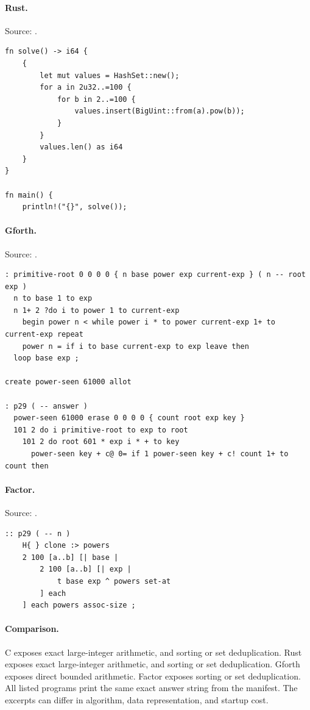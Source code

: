 \paragraph{Rust.} Source: .
\begin{lstlisting}
fn solve() -> i64 {
    {
        let mut values = HashSet::new();
        for a in 2u32..=100 {
            for b in 2..=100 {
                values.insert(BigUint::from(a).pow(b));
            }
        }
        values.len() as i64
    }
}

fn main() {
    println!("{}", solve());
\end{lstlisting}

\paragraph{Gforth.} Source: .
\begin{lstlisting}
: primitive-root 0 0 0 0 { n base power exp current-exp } ( n -- root exp )
  n to base 1 to exp
  n 1+ 2 ?do i to power 1 to current-exp
    begin power n < while power i * to power current-exp 1+ to current-exp repeat
    power n = if i to base current-exp to exp leave then
  loop base exp ;

create power-seen 61000 allot

: p29 ( -- answer )
  power-seen 61000 erase 0 0 0 0 { count root exp key }
  101 2 do i primitive-root to exp to root
    101 2 do root 601 * exp i * + to key
      power-seen key + c@ 0= if 1 power-seen key + c! count 1+ to count then
\end{lstlisting}

\paragraph{Factor.} Source: .
\begin{lstlisting}
:: p29 ( -- n )
    H{ } clone :> powers
    2 100 [a..b] [| base |
        2 100 [a..b] [| exp |
            t base exp ^ powers set-at
        ] each
    ] each powers assoc-size ;
\end{lstlisting}

\paragraph{Comparison.}
C exposes exact large-integer arithmetic, and sorting or set deduplication. Rust exposes exact large-integer arithmetic, and sorting or set deduplication. Gforth exposes direct bounded arithmetic. Factor exposes sorting or set deduplication.
All listed programs print the same exact answer string from the manifest. The excerpts can differ in algorithm, data representation, and startup cost.

